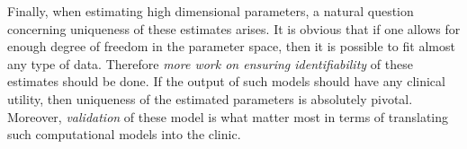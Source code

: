 Finally, when estimating high dimensional parameters, a natural question
concerning uniqueness of these estimates arises. It is obvious that if one allows for
enough degree of freedom in the parameter space, then it is possible
to fit almost any type of data. Therefore \emph{more work on ensuring
identifiability} of these estimates should be done. If the output of such
models should have any clinical utility, then uniqueness of the
estimated parameters is absolutely pivotal. Moreover, \emph{validation} of
these model is what matter most in terms of translating such computational
models into the clinic.






